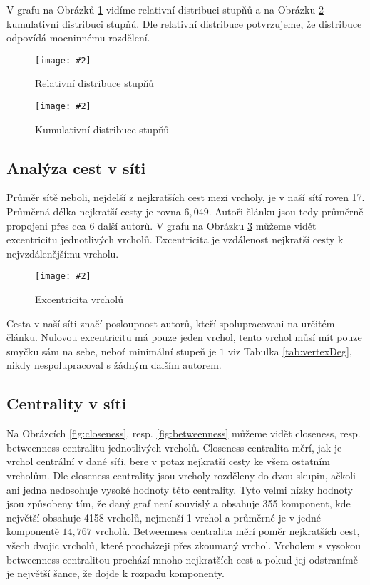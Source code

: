 \documentclass[a4paper,12pt]{article}
\newcommand{\image}[4]{\begin{figure}[h!] \centering \texttt{[image: \#2]} \caption{#4} \label{#3} \end{figure}}
\begin{document}
V grafu na Obrázků \ref{fig:relDegDist} vidíme relativní distribuci stupňů a na Obrázku \ref{fig:cummDegDist} kumulativní distribuci stupňů.
Dle relativní distribuce potvrzujeme, že distribuce odpovídá mocninnému rozdělení.

\image{0.75}{../grafy/relDD.pdf}{fig:relDegDist}{Relativní distribuce stupňů}
\image{0.7}{../grafy/cumDD.pdf}{fig:cummDegDist}{Kumulativní distribuce stupňů}

\FloatBarrier
\newpage

\subsection{Analýza cest v síti}
Průměr sítě neboli, nejdelší z nejkratších cest mezi vrcholy, je v naší sítí roven 17. Průměrná délka nejkratší cesty je rovna $6,049$. Autoři článku jsou 
tedy průměrně propojeni přes cca $6$ další autorů. V grafu na Obrázku \ref{fig:eccentricity} můžeme vidět excentricitu jednotlivých vrcholů.
Excentricita je vzdálenost nejkratší cesty k nejvzdálenějšímu vrcholu.

\image{0.7}{../grafy/eccentricity.pdf}{fig:eccentricity}{Excentricita vrcholů}

Cesta v naší síti značí posloupnost autorů, kteří spolupracovani na určitém článku. Nulovou excentricitu má pouze jeden vrchol, tento vrchol můsí mít pouze
smyčku sám na sebe, neboť minimální stupeň je $1$ viz Tabulka \ref{tab:vertexDeg}, nikdy nespolupracoval s žádným dalším autorem.

\FloatBarrier
\newpage
\subsection{Centrality v síti}
Na Obrázcích \ref{fig:closeness}, resp. \ref{fig:betweenness} můžeme vidět closeness, resp. betweenness centralitu jednotlivých vrcholů.
Closeness centralita měrí, jak je vrchol centrální v dané síťi, bere v potaz nejkratší cesty ke všem ostatním vrcholům.
Dle closeness centrality jsou vrcholy rozděleny do dvou skupin, ačkoli ani jedna nedosohuje vysoké hodnoty této centrality. Tyto velmi nízky hodnoty jsou
způsobeny tím, že daný graf není souvislý a obsahuje 355 komponent, kde největší obsahuje 4158 vrcholů, nejmenší 1 vrchol a průměrné je v jedné komponentě
$14,767$ vrcholů.
Betweenness centralita měrí poměr nejkratších cest, všech dvojic vrcholů, které procházeji přes zkoumaný vrchol. Vrcholem s vysokou betweenness centralitou
prochází mnoho nejkratších cest a pokud jej odstranímě je největší šance, že dojde k rozpadu komponenty.
\end{document}
